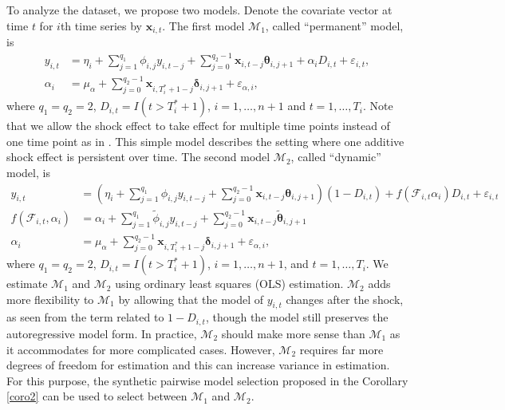 \documentclass[11pt]{article}
\def\mc#1{\mathcal{#1}} %
\def\mc#1{\mathcal{#1}}
\def\bs#1{\boldsymbol{#1}}
\theoremstyle{definition}
\begin{document}
To analyze the dataset, we propose two models. Denote the covariate vector at time $t$ for $i$th time series by $\bs{x}_{i,t}$.  The first model $\mc{M}_1$, called ``permanent'' model, is 
 \begin{align*}
 	y_{i,t} &= \eta_i + \sum_{j=1}^{q_1} \phi_{i,j} y_{i, t-j}  +\sum_{j=0}^{q_2-1} \bs{x}_{i, t-j}\bs{\theta}_{i, j + 1}  + \alpha_i  D_{i,t}+ \varepsilon_{i,t},\\
 	\alpha_i & = \mu_{\alpha} + \sum_{j=0}^{q_2-1} \bs{x}_{i, T_i^*+1-j}\bs{\delta}_{i, j + 1} + \varepsilon_{\alpha, i},
 \end{align*}
where $q_1 = q_2=2$, $D_{i,t} = I(t > T_i^*+1)$, $i = 1, \ldots, n+1$ and $t = 1, \ldots, T_i$. Note that we allow the shock effect to take effect for multiple time points instead of one time point as in  \cite{lin2021minimizing}. This simple model describes the setting where one additive shock effect is persistent over time. The second model $\mc{M}_2$, called ``dynamic'' model, is
\begin{align*}
 	y_{i,t}
 	&= \left(\eta_i + \sum_{j=1}^{q_1} \phi_{i,j} y_{i, t-j} + \sum_{j=0}^{q_2-1} \bs{x}_{i, t-j}\bs{\theta}_{i, j + 1} \right) (1-D_{i,t}) + f(\mc{F}_{i, t} \alpha_i)D_{i,t} + \varepsilon_{i,t}  \\
 	f(\mc{F}_{i,t},\alpha_i)	 & = \alpha_i +\sum_{j=1}^{q_1} \tilde{\phi}_{i, j} y_{i, t-j} + \sum_{j=0}^{q_2-1} \bs{x}_{i, t-j} \tilde{\bs{\theta}}_{i, j +1} \\
 	\alpha_i & = \mu_{\alpha} + \sum_{j=0}^{q_2-1} \bs{x}_{i, T_i^*+1-j}\bs{\delta}_{i, j + 1} + \varepsilon_{\alpha, i},
 \end{align*}
 where $q_1 = q_2=2$,  $D_{i,t} = I(t > T_i^*+1)$, $i = 1, \ldots, n+1$, and $t = 1, \ldots, T_i$. We estimate $\mc{M}_1$ and $\mc{M}_2$ using ordinary least squares (OLS) estimation. $\mc{M}_2$ adds more flexibility to $\mc{M}_1$ by allowing that the model of $y_{i,t}$ changes after the shock, as seen from the term related to $1-D_{i,t}$,  though the model still preserves the autoregressive model form. In practice, $\mc{M}_2$ should make more sense than $\mc{M}_1$ as it accommodates for more complicated cases. However, $\mc{M}_2$  requires far more degrees of freedom for estimation and this can increase variance in estimation. For this purpose, the synthetic pairwise model selection proposed in the Corollary \ref{coro2} can be used to select between $\mc{M}_1$ and $\mc{M}_2$.
 
\end{document}
